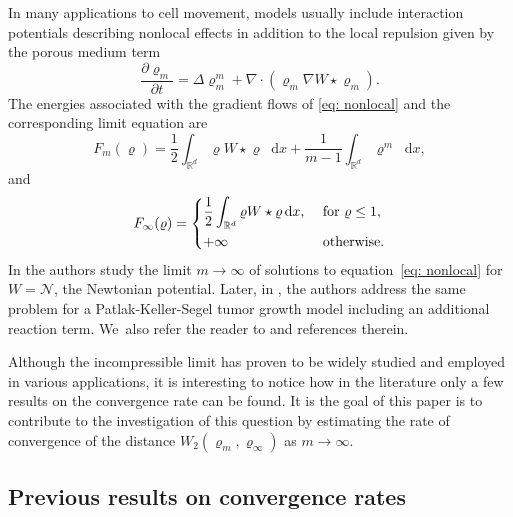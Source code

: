 \documentclass[10pt]{amsart}
\newcommand{\curlyN}{\mathcal{N}}
\newcommand{\partialt}[1]{\dfrac{\partial#1}{\partial t}}
\newcommand{\dx}[1]{\mathop{}\!\mathrm{d} #1}
\newcommand{\R}{\mathbb{R}}
\theoremstyle{plain}
\theoremstyle{remark}
\begin{document}
In many applications to cell movement, models usually include interaction potentials describing nonlocal effects in addition to the local repulsion given by the porous medium term
\begin{equation}\label{eq: nonlocal}
\partialt{\varrho_m} = \Delta \varrho_m^m +\nabla\cdot(\varrho_m \nabla W\star \varrho_m).
\end{equation}
The energies associated with the gradient flows of \eqref{eq: nonlocal} and the corresponding limit equation are
\begin{equation*}
F_m(\varrho) = \frac 12 \int_{\R^d} \varrho W\star \varrho \dx x + \frac{1}{m-1}\int_{\R^d} \varrho^m \dx x,
\end{equation*}
and
\begin{equation*}
F_\infty(\varrho) =
\begin{dcases}
\frac 12 \int_{\R^d} \varrho W\star \varrho \dx x, &\text{ for } \varrho\leq 1,\\
+\infty &\text{ otherwise}.
\end{dcases}
\end{equation*}
In \cite{CKY18} the authors study the limit $m\to\infty$ of solutions to equation~\eqref{eq: nonlocal} for \hbox{$W=\curlyN$}, the Newtonian potential. Later, in \cite{perthamePKS}, the authors address the same problem for a Patlak-Keller-Segel tumor growth model including an additional reaction term. We~also refer the reader to \cite{CT2020, CG2021, CCY2019} and references therein.

Although the incompressible limit has proven to be widely studied and employed in various applications, it is interesting to notice how in the literature only a few results on the convergence rate can be found.
It is the goal of this paper is to contribute to the investigation of this question by estimating the rate of convergence of the distance $W_2(\varrho_m, \varrho_\infty)$ as $m \to \infty$.

\subsection{Previous results on convergence rates}
\end{document}
